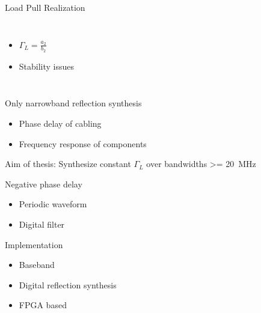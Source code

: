 \documentclass{beamer}
\begin{document}
\begin{frame}{Load Pull Realization}
\begin{example}
\begin{columns}
{
                }
                \begin{itemize}
                    \item $ \Gamma_L = \displaystyle\frac{a_2}{b_2} $
                    \item Stability issues
                \end{itemize}
        \end{columns}
    \end{example}
\end{frame}

\begin{frame}
    \begin{block}{Only narrowband reflection synthesis}
        \begin{itemize}
            \item Phase delay of cabling
            \item Frequency response of components
        \end{itemize}
    \end{block}
    \begin{exampleblock}{Aim of thesis: Synthesize constant $\Gamma_L$ over bandwidths \SI{>= 20}{\mega\hertz}}
        \centering
        \begin{minipage}{.9\textwidth}
            \begin{block}{Negative phase delay}
                \begin{itemize}
                    \item Periodic waveform
                    \item Digital filter
                \end{itemize}
            \end{block}
            \begin{block}{Implementation}
                \begin{itemize}
                    \item Baseband
                    \item Digital reflection synthesis
                    \item FPGA based
                \end{itemize}
            \end{block}
        \end{minipage}
    \end{exampleblock}
\end{frame}
\end{document}
